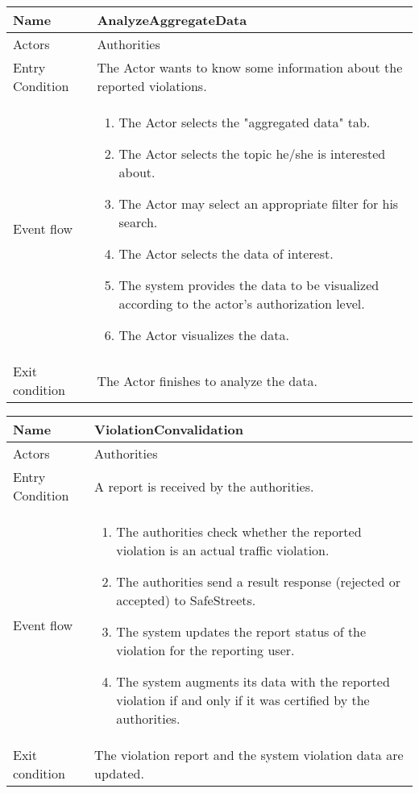 \vskip 0.2in
\begin{tabular}{|p{3.7cm}|p{11cm}|}
\hline
Name & AnalyzeAggregateData\\
\hline
Actors & Authorities\\
\hline
Entry Condition & The Actor wants to know some information about the reported violations.\\
\hline
Event flow & \begin{enumerate}
                \item The Actor selects the "aggregated data" tab.
                \item The Actor selects the topic he/she is interested about.
                \item The Actor may select an appropriate filter for his search.
                \item The Actor selects the data of interest.
                \item The system provides the data to be visualized according to the actor's authorization level.
                \item The Actor visualizes the data.
            \end{enumerate}\\
\hline
Exit condition & The Actor finishes to analyze the data.\\
\hline
\end{tabular}

\vskip 0.2in
\begin{tabular}{|p{3.7cm}|p{11cm}|}
\hline
Name & ViolationConvalidation\\
\hline
Actors & Authorities\\
\hline
Entry Condition & A report is received by the authorities.\\
\hline
Event flow & \begin{enumerate}
                \item The authorities check whether the reported violation is an actual traffic violation.
                \item The authorities send a result response (rejected or accepted) to SafeStreets.
                \item The system updates the report status of the violation for the reporting user.
                \item The system augments its data with the reported violation if and only if it was certified by the authorities.
            \end{enumerate}\\
\hline
Exit condition & The violation report and the system violation data are updated.\\
\hline
\end{tabular}


